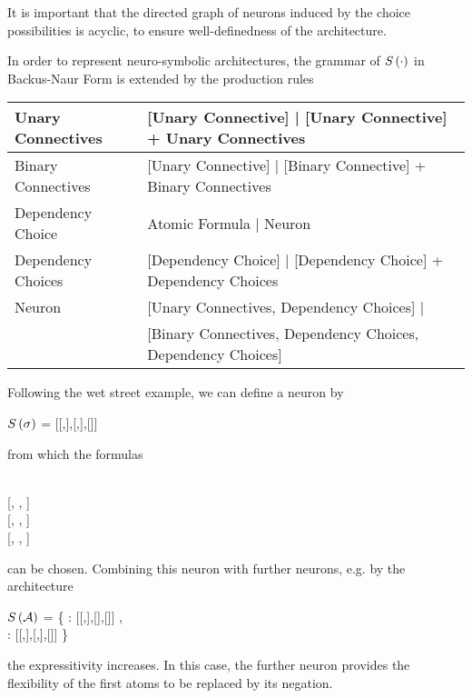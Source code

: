 It is important that the directed graph of neurons induced by the choice possibilities is acyclic, to ensure well-definedness of the architecture.


In order to represent neuro-symbolic architectures, the grammar of $S\left(\cdot\right)$ in Backus-Naur Form is extended by the production rules \\
\begin{tabular}{|l|l|}
  	\hline
 	Unary Connectives & [Unary Connective] | [Unary Connective] + Unary Connectives \\
  	\hline
 	Binary Connectives & [Unary Connective] | [Binary Connective] + Binary Connectives \\
  	\hline
 	Dependency Choice & Atomic Formula | Neuron \\ 
  	\hline
	Dependency Choices & [Dependency Choice] | [Dependency Choice] + Dependency Choices \\ 
	\hline
	Neuron & [Unary Connectives, Dependency Choices] | \\
	&  [Binary Connectives, Dependency Choices, Dependency Choices] \\
	\hline
\end{tabular}


\begin{example}
	Following the wet street example, we can define a neuron by
	\begin{centeredcode}
		$S\left(\sigma\right)$ = [[,],[,],[]] 
	\end{centeredcode}
	from which the formulas 
	\begin{centeredcode}
		[\stringof{imp}, \stringof{Wet}, \stringof{Street}] \\
		\hspace{0.25cm} [, , \stringof{Street}] \\
		\hspace{1cm}[, , \stringof{Street}] \\
		\hspace{1cm}[, , \stringof{Street}]		
	\end{centeredcode}
	can be chosen.
	Combining this neuron with further neurons, e.g. by the architecture
	\begin{centeredcode}
		$S\left(\mathcal{A}\right)$ = \{ : [[,],[],[]] , \\
		\hspace{1.8cm}: [[,],[,],[]] \}
	\end{centeredcode}
	the expressitivity increases.
	In this case, the further neuron provides the flexibility of the first atoms to be replaced by its negation.	
\end{example}





